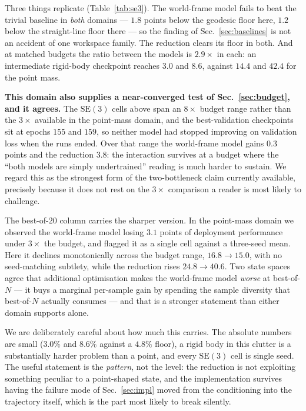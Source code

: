 \documentclass[10pt,twocolumn,letterpaper]{article}
\theoremstyle{plain}
\newcommand{\SE}{\mathrm{SE}(3)}
\begin{document}
Three things replicate (Table~\ref{tab:se3}). The world-frame model fails to beat
the trivial baseline in \emph{both} domains --- $1.8$ points below the geodesic
floor here, $1.2$ below the straight-line floor there --- so the finding of
Sec.~\ref{sec:baselines} is not an accident of one workspace family. The
reduction clears its floor in both. And at matched budgets the ratio between the
models is $2.9\times$ in each: an intermediate rigid-body checkpoint reaches $3.0$
and $8.6$, against $14.4$ and $42.4$ for the point mass.

\textbf{This domain also supplies a near-converged test of
Sec.~\ref{sec:budget}, and it agrees.} The $\SE$ cells above span an $8\times$
budget range rather than the $3\times$ available in the point-mass domain, and
the best-validation checkpoints sit at epochs $155$ and $159$, so neither model had
stopped improving on validation loss when the runs ended. Over that range the
world-frame model gains $0.3$ points and the reduction $3.8$: the interaction
survives at a budget where the ``both models are simply undertrained'' reading is
much harder to sustain. We regard this as the strongest form of the
two-bottleneck claim currently available, precisely because it does not rest on
the $3\times$ comparison a reader is most likely to challenge.

The best-of-$20$ column carries the sharper version. In the point-mass domain we
observed the world-frame model losing $3.1$ points of deployment performance under
$3\times$ the budget, and flagged it as a single cell against a three-seed mean.
Here it declines monotonically across the budget range, $16.8 \to 15.0$, with no
seed-matching subtlety, while the reduction rises $24.8 \to 40.6$. Two state
spaces agree that additional optimisation makes the world-frame model \emph{worse}
at best-of-$N$ --- it buys a marginal per-sample gain by spending the sample
diversity that best-of-$N$ actually consumes --- and that is a stronger statement
than either domain supports alone.

We are deliberately careful about how much this carries. The absolute numbers are
small ($3.0\%$ and $8.6\%$ against a $4.8\%$ floor), a rigid body in this clutter
is a substantially harder problem than a point, and every $\SE$ cell is single
seed. The useful statement is the \emph{pattern}, not the level: the reduction is
not exploiting something peculiar to a point-shaped state, and the implementation
survives having the failure mode of Sec.~\ref{sec:impl} moved from the
conditioning into the trajectory itself, which is the part most likely to break
silently.
\end{document}

